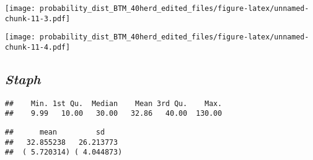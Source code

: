 \documentclass[]{article}
\newenvironment{Shaded}{\begin{snugshade}}{\end{snugshade}}
\newcommand{\KeywordTok}[1]{\textcolor[rgb]{0.13,0.29,0.53}{\textbf{#1}}}
\newcommand{\FloatTok}[1]{\textcolor[rgb]{0.00,0.00,0.81}{#1}}
\newcommand{\StringTok}[1]{\textcolor[rgb]{0.31,0.60,0.02}{#1}}
\newcommand{\CommentTok}[1]{\textcolor[rgb]{0.56,0.35,0.01}{\textit{#1}}}
\newcommand{\OperatorTok}[1]{\textcolor[rgb]{0.81,0.36,0.00}{\textbf{#1}}}
\newcommand{\NormalTok}[1]{#1}
\begin{document}
\texttt{[image: probability\_dist\_BTM\_40herd\_edited\_files/figure-latex/unnamed-chunk-11-3.pdf]}

\begin{Shaded}
\end{Shaded}

\texttt{[image: probability\_dist\_BTM\_40herd\_edited\_files/figure-latex/unnamed-chunk-11-4.pdf]}

\subsection{\texorpdfstring{\textbf{\emph{Staph}}}{Staph}}\label{staph}

\begin{Shaded}
\end{Shaded}

\begin{verbatim}
##    Min. 1st Qu.  Median    Mean 3rd Qu.    Max. 
##    9.99   10.00   30.00   32.86   40.00  130.00
\end{verbatim}

\begin{Shaded}
\end{Shaded}

\begin{verbatim}
##      mean         sd    
##   32.855238   26.213773 
##  ( 5.720314) ( 4.044873)
\end{verbatim}
\end{document}
